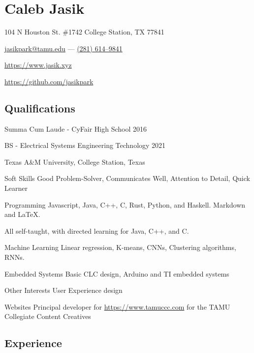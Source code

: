 \documentclass[letterpaper,10pt]{article}
\begin{document}
    \section{\Huge Caleb Jasik}\label{sec:hugecaleb-jasik}

    \hfill 104 N Houston St. \#1742 College Station, TX 77841

    \hfill \href{mailto:jasikpark@tamu.edu}{jasikpark@tamu.edu} ---
    \href{tel:2816149841}{(281) 614--9841}

    \hfill \href{https://jasik.xyz}{https://www.jasik.xyz}

    \hfill \href{https://github.com/jasikpark}{https://github.com/jasikpark}

    \subsection{Qualifications}\label{subsec:qualifications}

    Summa Cum Laude - CyFair High School 2016

    BS - Electrical Systems Engineering Technology 2021

    Texas A\&M University, College Station, Texas

    \begin{skills}
        \item[Soft Skills]
        Good Problem-Solver, Communicates Well, Attention to Detail, Quick Learner
        \item[Programming]
        Javascript, Java, C++, C, Rust, Python, and Haskell. Markdown and LaTeX.

        All self-taught, with directed learning for Java, C++, and C\@.
        \item[Machine Learning]
        Linear regression, K-means, CNNs, Clustering algorithms, RNNs.
        \item[Embedded Systems]
        Basic CLC design, Arduino and TI embedded systems
        \item[Other Interests]
        User Experience design
        \item[Websites]
        Principal developer for \href{https://www.tamuccc.com}{https://www.tamuccc.com} for the TAMU Collegiate Content Creatives
    \end{skills}


    \subsection{Experience}\label{subsec:experience}
\end{document}
